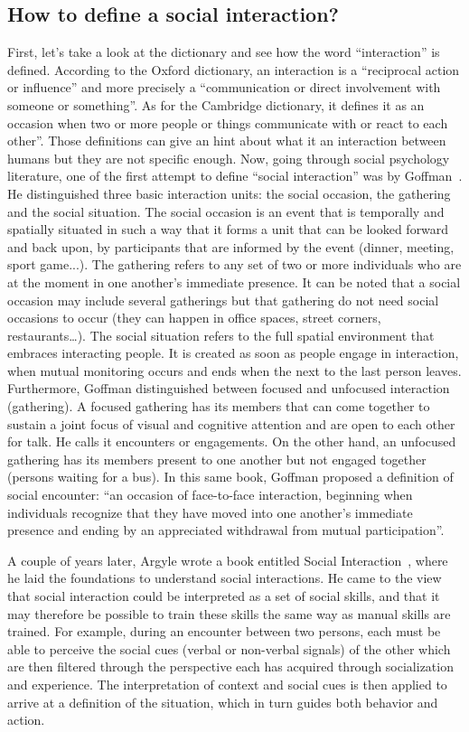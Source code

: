 \documentclass[a4paper,11pt,twoside]{StyleThese}
\begin{document}
\subsection{How to define a social interaction?}
First, let’s take a look at the dictionary and see how the word ``interaction'' is defined. According to the Oxford dictionary, an interaction is a ``reciprocal action or influence'' and more precisely a ``communication or direct involvement with someone or something''. As for the Cambridge dictionary, it defines it as an occasion when two or more people or things communicate with or react to each other''. Those definitions can give an hint about what it an interaction between humans but they are not specific enough. Now, going through social psychology literature, one of the first attempt to define ``social interaction'' was by Goffman~\cite{goffman_1967_interaction}. He distinguished three basic interaction units: the social occasion, the gathering and the social situation. The social occasion is an event that is temporally and spatially situated in such a way that it forms a unit that can be looked forward and back upon, by participants that are informed by the event (dinner, meeting, sport game...). The gathering refers to any set of two or more individuals who are at the moment in one another’s immediate presence. It can be noted that a social occasion may include several gatherings but that gathering do not need social occasions to occur (they can happen in office spaces, street corners, restaurants…). The social situation refers to the full spatial environment that embraces interacting people. It is created as soon as people engage in interaction, when mutual monitoring occurs and ends when the next to the last person leaves. Furthermore, Goffman distinguished between focused and unfocused interaction (gathering). A focused gathering has its members that can come together to sustain a joint focus of visual and cognitive attention and are open to each other for talk. He calls it encounters or engagements. On the other hand, an unfocused gathering has its members present to one another but not engaged together (\eg persons waiting for a bus). In this same book, Goffman proposed a definition of social encounter: ``an occasion of face-to-face interaction, beginning when individuals recognize that they have moved into one another’s immediate presence and ending by an appreciated withdrawal from mutual participation''.

A couple of years later, Argyle wrote a book entitled Social Interaction~\cite{argyle_1973_social}, where he laid the foundations to understand social interactions. He came to the view that social interaction could be interpreted as a set of social skills, and that it may therefore be possible to train these skills the same way as manual skills are trained. For example, during an encounter between two persons, each must be able to perceive the social cues (verbal or non-verbal signals) of the other which are then filtered through the perspective each has acquired through socialization and experience.  The interpretation of context and social cues is then applied to arrive at a definition of the situation, which in turn guides both behavior and action.
\end{document}
